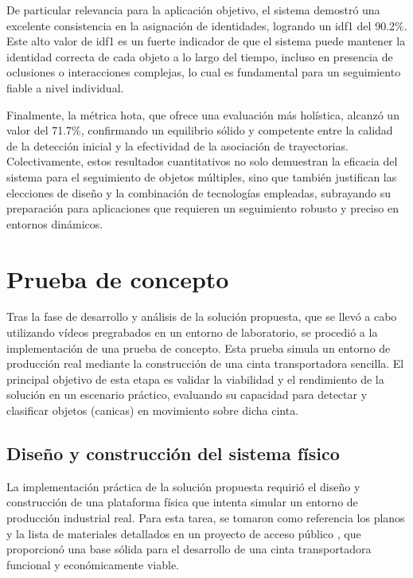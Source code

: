 \documentclass[11pt,spanish,listoffigures,listoftables]{tfgetsinf}
\begin{document}
De particular relevancia para la aplicación objetivo, el sistema demostró una excelente consistencia en la asignación de identidades, logrando un \gls{idf1} del 90.2\%. Este alto valor de \gls{idf1} es un fuerte indicador de que el sistema puede mantener la identidad correcta de cada objeto a lo largo del tiempo, incluso en presencia de oclusiones o interacciones complejas, lo cual es fundamental para un seguimiento fiable a nivel individual.

Finalmente, la métrica \gls{hota}, que ofrece una evaluación más holística, alcanzó un valor del 71.7\%, confirmando un equilibrio sólido y competente entre la calidad de la detección inicial y la efectividad de la asociación de trayectorias.
Colectivamente, estos resultados cuantitativos no solo demuestran la eficacia del sistema para el seguimiento de objetos múltiples, sino que también justifican las elecciones de diseño y la combinación de tecnologías empleadas, subrayando su preparación para aplicaciones que requieren un seguimiento robusto y preciso en entornos dinámicos.

\chapter{Prueba de concepto} \label{chap:prueba_concepto}
Tras la fase de desarrollo y análisis de la solución propuesta, que se llevó a cabo utilizando vídeos pregrabados en un entorno de laboratorio, se procedió a la implementación de una prueba de concepto. Esta prueba simula un entorno de producción real mediante la construcción de una cinta transportadora sencilla. El principal objetivo de esta etapa es validar la viabilidad y el rendimiento de la solución en un escenario práctico, evaluando su capacidad para detectar y clasificar objetos (canicas) en movimiento sobre dicha cinta.

\section{Diseño y construcción del sistema físico} \label{sec:diseno_construccion}
La implementación práctica de la solución propuesta requirió el diseño y construcción de una plataforma física que intenta simular un entorno de producción industrial real. Para esta tarea, se tomaron como referencia los planos y la lista de materiales detallados en un proyecto de acceso público \cite{hackster_counting_inspection}, que proporcionó una base sólida para el desarrollo de una cinta transportadora funcional y económicamente viable.
\end{document}
